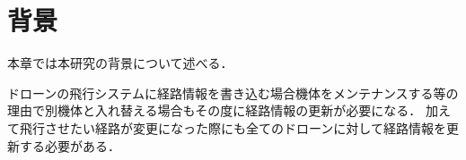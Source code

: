 \chapter{背景}
\label{background}

本章では本研究の背景について述べる．

%

ドローンの飛行システムに経路情報を書き込む場合機体をメンテナンスする等の理由で別機体と入れ替える場合もその度に経路情報の更新が必要になる．
加えて飛行させたい経路が変更になった際にも全てのドローンに対して経路情報を更新する必要がある．

